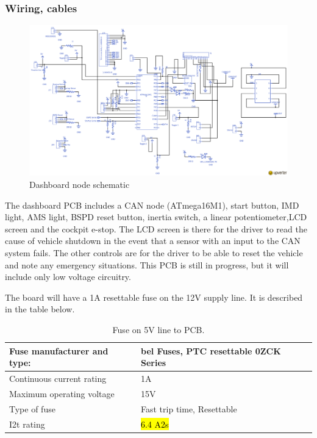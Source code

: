 \documentclass{article}
\DeclareRobustCommand{\hlr}[1]{{\sethlcolor{red}\hl{#1}}}
\begin{document}
        \subsubsection{Wiring, cables}

            \begin{figure}[H]
                \centering
                \includegraphics[width = 0.8 \textwidth]{Dashboardschem}
                \caption{Dashboard node schematic}
                \label{dashschem}
            \end{figure}

            The dashboard PCB includes a CAN node (ATmega16M1), start button, IMD light, AMS light, BSPD reset button, inertia switch, a linear potentiometer,LCD screen and the cockpit e-stop. The LCD screen is there for the driver to read the cause of vehicle shutdown in the event that a sensor with an input to the CAN system fails. The other controls are for the driver to be able to reset the vehicle and note any emergency situations. This PCB is still in progress, but it will include only low voltage circuitry.

            The board will have a 1A resettable fuse on the 12V supply line. It is described in the table below.

            \begin{table}[H]
                \centering
                \begin{tabular}{|l|l|}
                    \hline
                    Fuse manufacturer and type: & bel Fuses, PTC resettable 0ZCK Series\\ \hline
                    Continuous current rating & 1A \\ \hline
                    Maximum operating voltage & 15V \\ \hline
                    Type of fuse & Fast trip time, Resettable \\ \hline
                    I2t rating & \hlr{6.4 A2s}\\ \hline
                    \end{tabular}
                \caption{Fuse on 5V line to PCB.}
                \label{5V1Afuse}
            \end{table}
\end{document}
